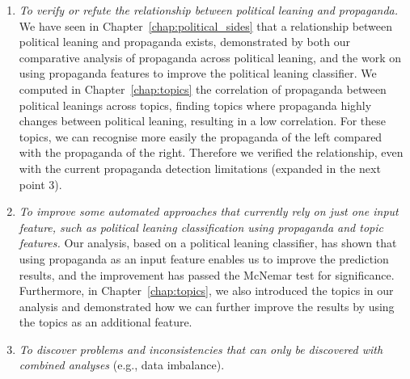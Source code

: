 \begin{enumerate} %
    \item \emph{To verify or refute the relationship between political leaning and propaganda.} %
          We have seen in Chapter~\ref{chap:political_sides} that a relationship between political leaning and propaganda exists, demonstrated by both our comparative analysis of propaganda across political leaning, and the work on using propaganda features to improve the political leaning classifier. %
          We computed in Chapter~\ref{chap:topics} the correlation of propaganda between political leanings across topics, finding topics where propaganda highly changes between political leaning, resulting in a low correlation. For these topics, we can recognise more easily the propaganda of the left compared with the propaganda of the right. Therefore we verified the relationship, even with the current propaganda detection limitations (expanded in the next point 3).
    \item \emph{To improve some automated approaches that currently rely on just one input feature, such as political leaning classification using propaganda and topic features.}
          Our analysis, based on a political leaning classifier, has shown that using propaganda as an input feature enables us to improve the prediction results, and the improvement has passed the McNemar test for significance. Furthermore, in Chapter~\ref{chap:topics}, we also introduced the topics in our analysis and demonstrated how we can further improve the results by using the topics as an additional feature.
    \item \emph{To discover problems and inconsistencies that can only be discovered with combined analyses} (e.g., data imbalance). %

\end{enumerate}
